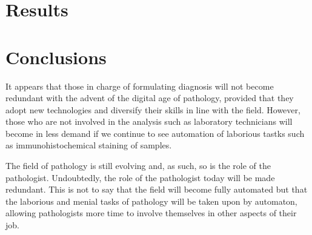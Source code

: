 \documentclass[12pt]{article}
\begin{document}
\section{Results}\label{results}

\section{Conclusions}\label{conclusions}

It appears that those in charge of formulating diagnosis will not become redundant with the advent of the digital age 
of pathology, provided that they adopt new technologies and diversify their skills in line with the field. However, those 
who are not involved in the analysis such as laboratory technicians will become in less demand if we continue to see 
automation of laborious tastks such as immunohistochemical staining of samples.

The field of pathology is still evolving and, as such, so is the role of the pathologist. Undoubtedly, the role of the 
pathologist today will be made redundant. This is not to say that the field will become fully automated but that the 
laborious and menial tasks of pathology will be taken upon by automaton, allowing pathologists more time to involve 
themselves in other aspects of their job.

\printbibliography
\end{document}
